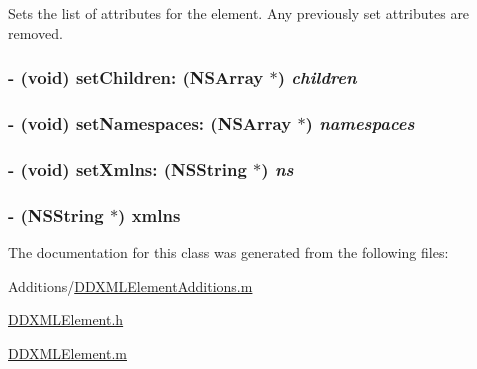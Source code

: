 \label{class_d_d_x_m_l_element_ab3c20c2f6b0dfa3f73183b53c0a325ed}
Sets the list of attributes for the element. Any previously set attributes are removed. \hypertarget{class_d_d_x_m_l_element_a27b5fd6a5001e98ef1ab21c914dcd564}{
\subsubsection[{setChildren:}]{\setlength{\rightskip}{0pt plus 5cm}-\/ (void) setChildren: (NSArray $\ast$) {\em children}}}
\label{class_d_d_x_m_l_element_a27b5fd6a5001e98ef1ab21c914dcd564}
\hypertarget{class_d_d_x_m_l_element_a7e1763f7cc29c187309c7efe1a9b16a2}{
\subsubsection[{setNamespaces:}]{\setlength{\rightskip}{0pt plus 5cm}-\/ (void) setNamespaces: (NSArray $\ast$) {\em namespaces}}}
\label{class_d_d_x_m_l_element_a7e1763f7cc29c187309c7efe1a9b16a2}
\hypertarget{class_d_d_x_m_l_element_a639df32cb3879409fe2941ef5655fe4c}{
\subsubsection[{setXmlns:}]{\setlength{\rightskip}{0pt plus 5cm}-\/ (void) setXmlns: ({\bf NSString} $\ast$) {\em ns}}}
\label{class_d_d_x_m_l_element_a639df32cb3879409fe2941ef5655fe4c}
\hypertarget{class_d_d_x_m_l_element_aaa6f683fff1b13790bc35958ed198e3e}{
\subsubsection[{xmlns}]{\setlength{\rightskip}{0pt plus 5cm}-\/ ({\bf NSString} $\ast$) xmlns }}
\label{class_d_d_x_m_l_element_aaa6f683fff1b13790bc35958ed198e3e}


The documentation for this class was generated from the following files:\begin{DoxyCompactItemize}
\item 
Additions/\hyperlink{_d_d_x_m_l_element_additions_8m}{DDXMLElementAdditions.m}\item 
\hyperlink{_d_d_x_m_l_element_8h}{DDXMLElement.h}\item 
\hyperlink{_d_d_x_m_l_element_8m}{DDXMLElement.m}\end{DoxyCompactItemize}

